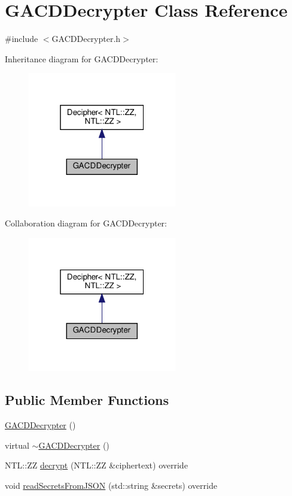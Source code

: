 \hypertarget{classGACDDecrypter}{}\section{G\+A\+C\+D\+Decrypter Class Reference}
\label{classGACDDecrypter}


{\ttfamily \#include $<$G\+A\+C\+D\+Decrypter.\+h$>$}



Inheritance diagram for G\+A\+C\+D\+Decrypter\+:
\nopagebreak
\begin{figure}[H]
\begin{center}
\leavevmode
\includegraphics[width=184pt]{classGACDDecrypter__inherit__graph}
\end{center}
\end{figure}


Collaboration diagram for G\+A\+C\+D\+Decrypter\+:
\nopagebreak
\begin{figure}[H]
\begin{center}
\leavevmode
\includegraphics[width=184pt]{classGACDDecrypter__coll__graph}
\end{center}
\end{figure}
\subsection*{Public Member Functions}
\begin{DoxyCompactItemize}
\item 
\hyperlink{classGACDDecrypter_a3ce2ad60f6e2a6bb5e474df80e65a61d}{G\+A\+C\+D\+Decrypter} ()
\item 
virtual \hyperlink{classGACDDecrypter_a4b26823dd1b16c5023639ec62475316a}{$\sim$\+G\+A\+C\+D\+Decrypter} ()
\item 
N\+T\+L\+::\+ZZ \hyperlink{classGACDDecrypter_a92f6afd3d0a43dd5538cf6a83398ee33}{decrypt} (N\+T\+L\+::\+ZZ \&ciphertext) override
\item 
void \hyperlink{classGACDDecrypter_a7634cc069e61c1a3cf2443fed7c2b15f}{read\+Secrets\+From\+J\+S\+ON} (std\+::string \&secrets) override
\end{DoxyCompactItemize}
